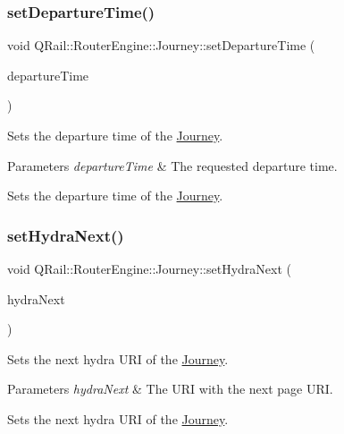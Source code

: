 \subsubsection{\texorpdfstring{setDepartureTime()}{setDepartureTime()}}
{\footnotesize\ttfamily void Q\+Rail\+::\+Router\+Engine\+::\+Journey\+::set\+Departure\+Time (\begin{DoxyParamCaption}\item[{const Q\+Date\+Time \&}]{departure\+Time }\end{DoxyParamCaption})}



Sets the departure time of the \mbox{\hyperlink{classQRail_1_1RouterEngine_1_1Journey}{Journey}}. 


\begin{DoxyParams}{Parameters}
{\em departure\+Time} & The requested departure time.\\
\hline
\end{DoxyParams}
Sets the departure time of the \mbox{\hyperlink{classQRail_1_1RouterEngine_1_1Journey}{Journey}}. \mbox{\label{classQRail_1_1RouterEngine_1_1Journey_a79b4e4ae7edc0508cf05d1c250713283}} 
\subsubsection{\texorpdfstring{setHydraNext()}{setHydraNext()}}
{\footnotesize\ttfamily void Q\+Rail\+::\+Router\+Engine\+::\+Journey\+::set\+Hydra\+Next (\begin{DoxyParamCaption}\item[{const Q\+Url \&}]{hydra\+Next }\end{DoxyParamCaption})}



Sets the next hydra U\+RI of the \mbox{\hyperlink{classQRail_1_1RouterEngine_1_1Journey}{Journey}}. 


\begin{DoxyParams}{Parameters}
{\em hydra\+Next} & The U\+RI with the next page U\+RI.\\
\hline
\end{DoxyParams}
Sets the next hydra U\+RI of the \mbox{\hyperlink{classQRail_1_1RouterEngine_1_1Journey}{Journey}}. \mbox{\label{classQRail_1_1RouterEngine_1_1Journey_acdb5fa099702119d04b57b23737e2bdf}} 
